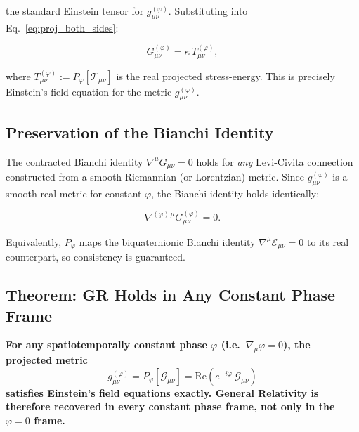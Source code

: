 the standard Einstein tensor for $g_{\mu\nu}^{(\varphi)}$.  Substituting into
Eq.~\eqref{eq:proj_both_sides}:

\begin{equation}
\label{eq:gr_recovered}
\boxed{G_{\mu\nu}^{(\varphi)} = \kappa\,T_{\mu\nu}^{(\varphi)}},
\end{equation}

where $T_{\mu\nu}^{(\varphi)} := P_\varphi[\mathcal{T}_{\mu\nu}]$ is the real projected stress-energy.
This is precisely Einstein's field equation for the metric $g_{\mu\nu}^{(\varphi)}$.

\subsection{Preservation of the Bianchi Identity}

The contracted Bianchi identity $\nabla^\mu G_{\mu\nu} = 0$ holds for \emph{any} Levi-Civita
connection constructed from a smooth Riemannian (or Lorentzian) metric.  Since $g_{\mu\nu}^{(\varphi)}$
is a smooth real metric for constant $\varphi$, the Bianchi identity holds identically:

\begin{equation}
\nabla^{(\varphi)\,\mu} G_{\mu\nu}^{(\varphi)} = 0.
\end{equation}

Equivalently, $P_\varphi$ maps the biquaternionic Bianchi identity
$\nabla^{\mu}\mathcal{E}_{\mu\nu} = 0$ to its real counterpart, so consistency is guaranteed.

\subsection{Theorem: GR Holds in Any Constant Phase Frame}

\begin{tcolorbox}[colback=blue!5!white,colframe=blue!75!black,title=Theorem (GR as Constant-Phase Limit)]
\textbf{For any spatiotemporally constant phase $\varphi$ (i.e.\ $\nabla_\mu\varphi = 0$),
the projected metric}
\begin{equation*}
g_{\mu\nu}^{(\varphi)} = P_\varphi[\mathcal{G}_{\mu\nu}] = \mathrm{Re}(e^{-i\varphi}\,\mathcal{G}_{\mu\nu})
\end{equation*}
\textbf{satisfies Einstein's field equations exactly.  General Relativity is therefore recovered
in every constant phase frame, not only in the $\varphi = 0$ frame.}
\end{tcolorbox}

